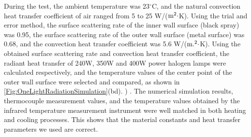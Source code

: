 
During the test, the ambient temperature was 23$^{\circ}$C, and the natural convection heat transfer coefficient of air ranged from 5 to 25 W/(${\rm{m}}^2\cdot$K).
Using the trial and error method, the surface scattering rate of the inner wall surface (black spray) was 0.95, the surface scattering rate of the outer wall surface (metal surface) was 0.68, and the convection heat transfer coefficient was 5.6 W/(${\rm{m}}. ^2\cdot$K).
Using the obtained surface scattering rate and convection heat transfer coefficient, the radiant heat transfer of 240W, 350W and 400W power halogen lamps were calculated respectively, and the temperature values of the center point of the outer wall surface were selected and compared, as shown in \ref{Fig:OneLightRadiationSimulation}(bd). ) .
The numerical simulation results, thermocouple measurement values, and the temperature values obtained by the infrared temperature measurement instrument were well matched in both heating and cooling processes. This shows that the material constants and heat transfer parameters we used are correct.

